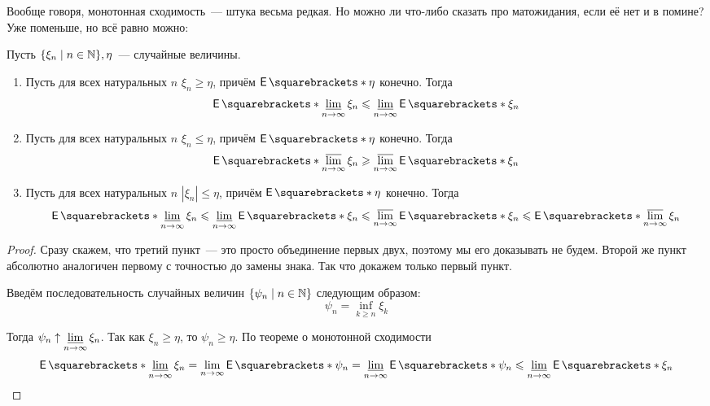 Вообще говоря, монотонная сходимость~--- штука весьма редкая. Но можно ли что-либо сказать про матожидания, если её нет и в помине? Уже поменьше, но всё равно можно:
\begin{lemma}[Фату]
	Пусть \(\{\xi_n \mid n \in \mathbb{N}\}, \eta\)~--- случайные величины.
	\begin{enumerate}
		\item Пусть для всех натуральных \(n\) \(\xi_n \geq \eta\), причём \(\E{\eta}\) конечно. Тогда 
		\[
			\E{\varliminf\limits_{n \to \infty} \xi_n} \leq \varliminf\limits_{n \to \infty} \E{\xi_n}
		\]
		
		\item Пусть для всех натуральных \(n\) \(\xi_n \leq \eta\), причём \(\E{\eta}\) конечно. Тогда 
		\[
			\E{\varlimsup\limits_{n \to \infty} \xi_n} \geq \varlimsup\limits_{n \to \infty} \E{\xi_n}
		\]
		
		\item Пусть для всех натуральных \(n\) \(|\xi_n| \leq \eta\), причём \(\E{\eta}\) конечно. Тогда 
		\[
			\E{\varliminf\limits_{n \to \infty} \xi_n} \leq \varliminf\limits_{n \to \infty} \E{\xi_n} \leq \varlimsup\limits_{n \to \infty} \E{\xi_n} \leq \E{\varlimsup\limits_{n \to \infty} \xi_n}
		\]
	\end{enumerate}
\end{lemma}
\begin{proof}
	Сразу скажем, что третий пункт~--- это просто объединение первых двух, поэтому мы его доказывать не будем. Второй же пункт абсолютно аналогичен первому с точностью до замены знака. Так что докажем только первый пункт.
	
	Введём последовательность случайных величин \(\{\psi_n \mid n \in \mathbb{N}\}\) следующим образом:
	\[
		\psi_n = \inf\limits_{k \geq n} \xi_k
	\]
	
	Тогда \(\psi_n \uparrow \varliminf\limits_{n \to \infty} \xi_n\). Так как \(\xi_n \geq \eta\), то \(\psi_n \geq \eta\). По теореме о монотонной сходимости
	\[
		\E{\varliminf\limits_{n \to \infty} \xi_n} = \lim\limits_{n \to \infty} \E{\psi_n} = \varliminf\limits_{n \to \infty} \E{\psi_n} \leq \varliminf\limits_{n \to \infty} \E{\xi_n}\qedhere
	\]
\end{proof}

